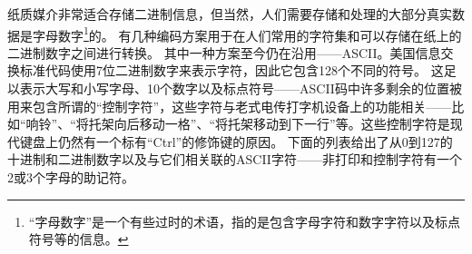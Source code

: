 纸质媒介非常适合存储二进制信息，但当然，人们需要存储和处理的大部分真实数据是字母数字\footnote{“字母数字”是一个有些过时的术语，指的是包含字母字符和数字字符以及标点符号等的信息。}的。
有几种编码方案用于在人们常用的字符集和可以存储在纸上的二进制数字之间进行转换。
其中一种方案至今仍在沿用——ASCII。美国信息交换标准代码使用7位二进制数字来表示字符，因此它包含128个不同的符号。
这足以表示大写和小写字母、10个数字以及标点符号——ASCII码中许多剩余的位置被用来包含所谓的“控制字符”，这些字符与老式电传打字机设备上的功能相关——比如“响铃”、“将托架向后移动一格”、“将托架移动到下一行”等。这些控制字符是现代键盘上仍然有一个标有“Ctrl”的修饰键的原因。
下面的列表给出了从0到127的十进制和二进制数字以及与它们相关联的ASCII字符——非打印和控制字符有一个2或3个字母的助记符。

\renewcommand{\baselinestretch}{.9}
\renewcommand{\arraystretch}{.9}

